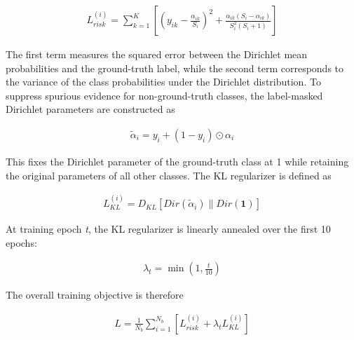 \documentclass[11pt,a4paper]{article}
\begin{document}
\begin{equation}
\begin{array}{r}
L_{risk}^{(i)} = \sum_{k = 1}^{K}\left\lbrack \left( y_{ik} - \frac{\alpha_{ik}}{S_{i}} \right)^{2} + \frac{\alpha_{ik}(S_{i} - \alpha_{ik})}{S_{i}^{2}(S_{i} + 1)} \right\rbrack
\end{array}
\label{eq:supp6}
\end{equation}

The first term measures the squared error between the Dirichlet mean probabilities and the ground-truth label, while the second term corresponds to the variance of the class probabilities under the Dirichlet distribution. To suppress spurious evidence for non-ground-truth classes, the label-masked Dirichlet parameters are constructed as

\begin{equation}
\begin{array}{r}
{\widetilde{\alpha}}_{i} = y_{i} + (1 - y_{i}) \odot \alpha_{i}
\end{array}
\label{eq:supp7}
\end{equation}

This fixes the Dirichlet parameter of the ground-truth class at 1 while retaining the original parameters of all other classes. The KL regularizer is defined as

\begin{equation}
\begin{array}{r}
L_{KL}^{(i)} = D_{KL}\left\lbrack Dir({\widetilde{\alpha}}_{i}) \parallel Dir(\mathbf{1}) \right\rbrack
\end{array}
\label{eq:supp8}
\end{equation}

At training epoch \emph{t}, the KL regularizer is linearly annealed over the first 10 epochs:

\begin{equation}
\begin{array}{r}
\lambda_{t} = \min\left( 1,\frac{t}{10} \right)
\end{array}
\label{eq:supp9}
\end{equation}

The overall training objective is therefore

\begin{equation}
\begin{array}{r}
L = \frac{1}{N_{b}}\sum_{i = 1}^{N_{b}}\left\lbrack L_{risk}^{(i)} + \lambda_{t}L_{KL}^{(i)} \right\rbrack
\end{array}
\label{eq:supp10}
\end{equation}
\end{document}
